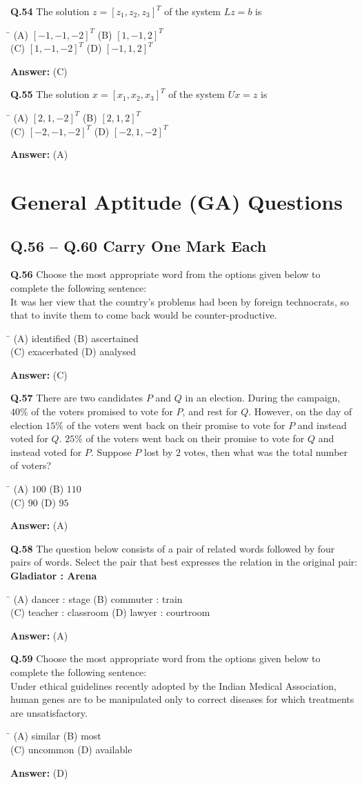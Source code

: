 \documentclass[11pt,a4paper]{article}
\newcommand{\optsfourA}[4]{%
  \begin{tabbing}
    \hspace{0.48\linewidth}\=\kill
    (A) #1 \> (B) #2 \\[2pt]
    (C) #3 \> (D) #4
  \end{tabbing}%
}
\newcommand{\ans}[1]{\textbf{Answer:} #1\par\medskip}
\begin{document}
\textbf{Q.54} The solution $z = [z_1, z_2, z_3]^T$ of the system $Lz = b$ is
\optsfourA{$[-1, -1, -2]^T$}{$[1, -1, 2]^T$}{$[1, -1, -2]^T$}{$[-1, 1, 2]^T$}
\ans{(C)}

\textbf{Q.55} The solution $x = [x_1, x_2, x_3]^T$ of the system $Ux = z$ is
\optsfourA{$[2, 1, -2]^T$}{$[2, 1, 2]^T$}{$[-2, -1, -2]^T$}{$[-2, 1, -2]^T$}
\ans{(A)}

\section*{General Aptitude (GA) Questions}

\subsection*{Q.56 -- Q.60 Carry One Mark Each}

\textbf{Q.56} Choose the most appropriate word from the options given below to complete the following sentence:\\
It was her view that the country's problems had been \underline{\hspace{2cm}} by foreign technocrats, so that to invite them to come back would be counter-productive.
\optsfourA{identified}{ascertained}{exacerbated}{analysed}
\ans{(C)}

\textbf{Q.57} There are two candidates $P$ and $Q$ in an election. During the campaign, $40\%$ of the voters promised to vote for $P$, and rest for $Q$. However, on the day of election $15\%$ of the voters went back on their promise to vote for $P$ and instead voted for $Q$. $25\%$ of the voters went back on their promise to vote for $Q$ and instead voted for $P$. Suppose $P$ lost by $2$ votes, then what was the total number of voters?
\optsfourA{$100$}{$110$}{$90$}{$95$}
\ans{(A)}

\textbf{Q.58} The question below consists of a pair of related words followed by four pairs of words. Select the pair that best expresses the relation in the original pair:\\
\textbf{Gladiator : Arena}
\optsfourA{dancer : stage}{commuter : train}{teacher : classroom}{lawyer : courtroom}
\ans{(A)}

\textbf{Q.59} Choose the most appropriate word from the options given below to complete the following sentence:\\
Under ethical guidelines recently adopted by the Indian Medical Association, human genes are to be manipulated only to correct diseases for which \underline{\hspace{2cm}} treatments are unsatisfactory.
\optsfourA{similar}{most}{uncommon}{available}
\ans{(D)}
\end{document}
